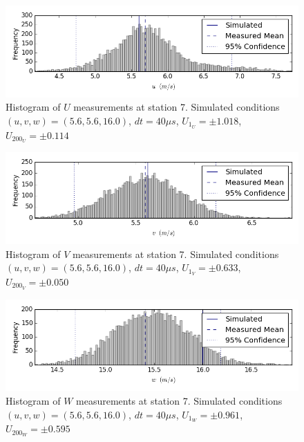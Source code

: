 \begin{figure}[H]
\centering
\includegraphics[width=6in]{figs/Ely_May28th07002/uncertainty_Ely_May28th07002_U}
\caption{Histogram of $U$ measurements at station 7. Simulated conditions $(u,v,w)=(5.6, 5.6, 16.0)$, $dt=40 \mu s$, $U_1_U=\pm 1.018$, $U_200_U=\pm 0.114$}
\label{fig:uncertainty_Ely_May28th07002_U}
\end{figure}


\begin{figure}[H]
\centering
\includegraphics[width=6in]{figs/Ely_May28th07002/uncertainty_Ely_May28th07002_V}
\caption{Histogram of $V$ measurements at station 7. Simulated conditions $(u,v,w)=(5.6, 5.6, 16.0)$, $dt=40 \mu s$, $U_1_V=\pm 0.633$, $U_200_V=\pm 0.050$}
\label{fig:uncertainty_Ely_May28th07002_V}
\end{figure}


\begin{figure}[H]
\centering
\includegraphics[width=6in]{figs/Ely_May28th07002/uncertainty_Ely_May28th07002_W}
\caption{Histogram of $W$ measurements at station 7. Simulated conditions $(u,v,w)=(5.6, 5.6, 16.0)$, $dt=40 \mu s$, $U_1_W=\pm 0.961$, $U_200_W=\pm 0.595$}
\label{fig:uncertainty_Ely_May28th07002_W}
\end{figure}


